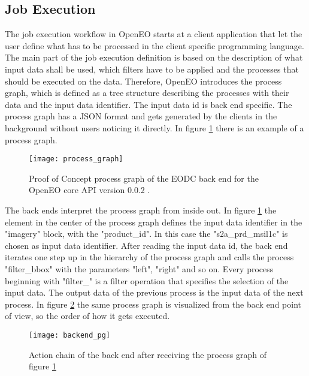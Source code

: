 \documentclass[draft,final]{vutinfth} %
\begin{document}
\subsection{Job Execution}\label{Job Execution}
The job execution workflow in OpenEO starts at a client application that let the user define what has to be processed in the client specific programming language.
The main part of the job execution definition is based on the description of what input data shall be used, which filters have to be applied and the processes that should be executed on the data. Therefore, OpenEO introduces the process graph, which is defined as a tree structure describing the processes with their data and the input data identifier. The input data id is back end specific. The process graph has a JSON format and gets generated by the clients in the background without users noticing it directly. In figure \ref{fig:process_graph} there is an example of a process graph. 

\begin{figure}[h]
	\centering
	\texttt{[image: process\_graph]}
	\caption{Proof of Concept process graph of the EODC back end for the OpenEO core API version 0.0.2 . \cite{openeo_api_desc}}
	\label{fig:process_graph} %
\end{figure}

The back ends interpret the process graph from inside out. In figure \ref{fig:process_graph} the element in the center of the process graph defines the input data identifier in the "imagery" block, with the "product\_id". In this case the "s2a\_prd\_msil1c" is chosen  as input data identifier. After reading the input data id, the back end iterates one step up in the hierarchy of the process graph and calls the process "filter\_bbox" with the parameters "left", "right" and so on. Every process beginning with "filter\_" is a filter operation that specifies the selection of the input data. The output data of the previous process is the input data of the next process. In figure \ref{fig:process_graph_diagram} the same process graph is visualized from the back end point of view, so the order of how it gets executed. 

\begin{figure}[h]
	\centering
	\texttt{[image: backend\_pg]}
	\caption{Action chain of the back end after receiving the process graph of figure \ref{fig:process_graph}}
	\label{fig:process_graph_diagram} %
\end{figure}
\end{document}
